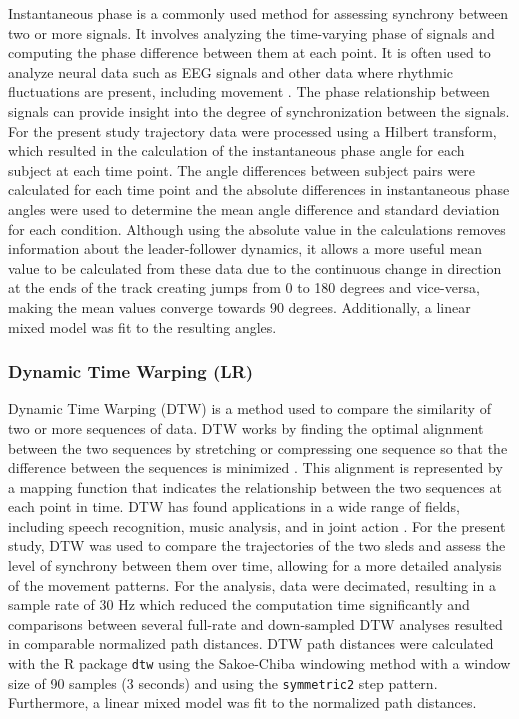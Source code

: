 \documentclass[10pt,a4paper,onecolumn]{article}
\begin{document}
Instantaneous phase is a commonly used method for assessing synchrony between two or more signals. It involves analyzing the time-varying phase of signals and computing the phase difference between them at each point. It is often used to analyze neural data such as EEG signals and other data where rhythmic fluctuations are present, including movement \autocite{varletComputationContinuousRelative2011a}. The phase relationship between signals can provide insight into the degree of synchronization between the signals. For the present study trajectory data were processed using a Hilbert transform, which resulted in the calculation of the instantaneous phase angle for each subject at each time point. The angle differences between subject pairs were calculated for each time point and the absolute differences in instantaneous phase angles were used to determine the mean angle difference and standard deviation for each condition. Although using the absolute value in the calculations removes information about the leader-follower dynamics, it allows a more useful mean value to be calculated from these data due to the continuous change in direction at the ends of the track creating jumps from 0 to 180 degrees and vice-versa, making the mean values converge towards 90 degrees. Additionally, a linear mixed model was fit to the resulting angles.

\hypertarget{dynamic-time-warping-lr}{%
\subsubsection{Dynamic Time Warping (LR)}\label{dynamic-time-warping-lr}}

Dynamic Time Warping (DTW) is a method used to compare the similarity of two or more sequences of data. DTW works by finding the optimal alignment between the two sequences by stretching or compressing one sequence so that the difference between the sequences is minimized \autocite{mullerDynamicTimeWarping2007}. This alignment is represented by a mapping function that indicates the relationship between the two sequences at each point in time. DTW has found applications in a wide range of fields, including speech recognition, music analysis, and in joint action \autocite{hochDancingTogetherInfant2021}. For the present study, DTW was used to compare the trajectories of the two sleds and assess the level of synchrony between them over time, allowing for a more detailed analysis of the movement patterns. For the analysis, data were decimated, resulting in a sample rate of 30 Hz which reduced the computation time significantly and comparisons between several full-rate and down-sampled DTW analyses resulted in comparable normalized path distances. DTW path distances were calculated with the R package \texttt{dtw} \autocite{R-dtw} using the Sakoe-Chiba windowing method \autocite{gelerDynamicTimeWarping2019} with a window size of 90 samples (3 seconds) and using the \texttt{symmetric2} step pattern. Furthermore, a linear mixed model was fit to the normalized path distances.
\end{document}
